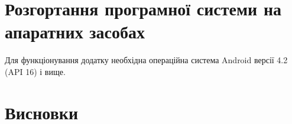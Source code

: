 \documentclass[../main.tex]{subfiles}
\begin{document}


\section{Розгортання програмної системи на апаратних засобах}

Для функціонування додатку необхідна операційна система Android версії 4.2 (API 16) і вище.


\section{Висновки}

\end{document}
